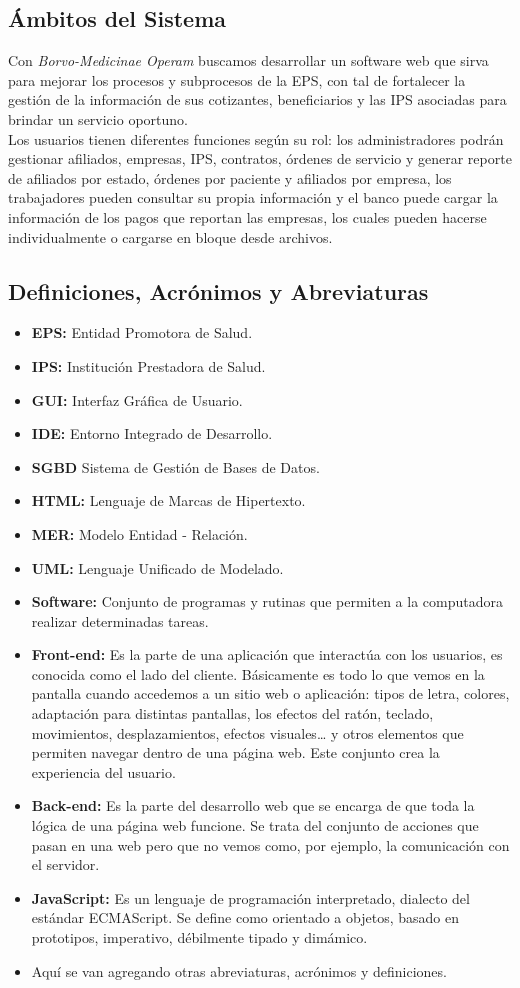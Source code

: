 \documentclass[12pt,a4paper]{article}
\begin{document}
\subsection{Ámbitos del Sistema}
Con \emph{Borvo-Medicinae Operam} buscamos desarrollar un software web que sirva para mejorar los procesos y subprocesos de la EPS, con tal de fortalecer la gestión de la información de sus cotizantes, beneficiarios y las IPS asociadas para brindar un servicio oportuno.\\

Los usuarios tienen diferentes funciones según su rol: los administradores podrán gestionar afiliados, empresas, IPS, contratos, órdenes de servicio y generar reporte de afiliados por estado, órdenes por paciente y afiliados por empresa, los trabajadores pueden consultar su propia información y el banco puede cargar la información de los pagos que reportan las empresas, los cuales pueden hacerse individualmente o cargarse en bloque desde archivos.
\subsection{Definiciones, Acrónimos y Abreviaturas}
\begin{itemize}
\item \textbf{EPS:} Entidad Promotora de Salud.
\item \textbf{IPS:} Institución Prestadora de Salud.
\item \textbf{GUI:} Interfaz Gráfica de Usuario.
\item \textbf{IDE:} Entorno Integrado de Desarrollo.
\item \textbf{SGBD} Sistema de Gestión de Bases de Datos.
\item \textbf{HTML:} Lenguaje de Marcas de Hipertexto.
\item \textbf{MER:} Modelo Entidad - Relación.
\item \textbf{UML:} Lenguaje Unificado de Modelado.
\item \textbf{Software:} Conjunto de programas y rutinas que permiten a la computadora realizar determinadas tareas.
\item \textbf{Front-end:} Es la parte de una aplicación que interactúa con los usuarios, es conocida como el lado del cliente. Básicamente es todo lo que vemos en la pantalla cuando accedemos a un sitio web o aplicación: tipos de letra, colores, adaptación para distintas pantallas, los efectos del ratón, teclado, movimientos, desplazamientos, efectos visuales… y otros elementos que permiten navegar dentro de una página web. Este conjunto crea la experiencia del usuario.
\item \textbf{Back-end:} Es la parte del desarrollo web que se encarga de que toda la lógica de una página web  funcione. Se trata del conjunto de acciones que pasan en una web pero que no vemos como, por ejemplo, la comunicación con el servidor.
\item \textbf{JavaScript:} Es un lenguaje de programación interpretado, dialecto del estándar ECMAScript. Se define como orientado a objetos, basado en prototipos, imperativo, débilmente tipado y dimámico.
\item Aquí se van agregando otras abreviaturas, acrónimos y definiciones.
\end{itemize}
\end{document}

